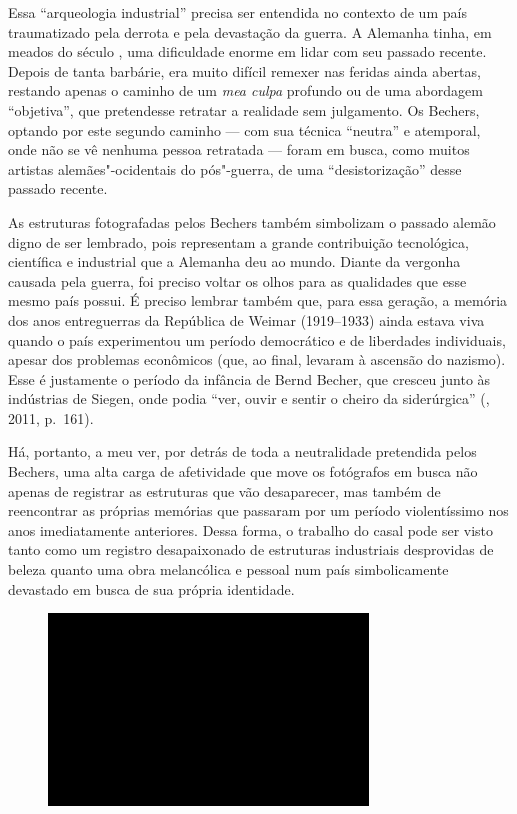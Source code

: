 Essa ``arqueologia industrial'' precisa ser entendida no contexto de um
país traumatizado pela derrota e pela devastação da guerra. A Alemanha
tinha, em meados do século , uma dificuldade enorme em lidar com seu
passado recente. Depois de tanta barbárie, era muito difícil remexer nas
feridas ainda abertas, restando apenas o caminho de um \emph{mea culpa}
profundo ou de uma abordagem ``objetiva'', que pretendesse retratar a
realidade sem julgamento. Os Bechers, optando por este segundo caminho
--- com sua técnica ``neutra'' e atemporal, onde não se vê nenhuma pessoa
retratada --- foram em busca, como muitos artistas alemães"-ocidentais do
pós"-guerra, de uma ``desistorização'' desse passado recente.

As estruturas fotografadas pelos Bechers também simbolizam o passado
alemão digno de ser lembrado, pois representam a grande contribuição
tecnológica, científica e industrial que a Alemanha deu ao mundo. Diante
da vergonha causada pela guerra, foi preciso voltar os olhos para as
qualidades que esse mesmo país possui. É preciso lembrar também que,
para essa geração, a memória dos anos entreguerras da República de
Weimar (1919--1933) ainda estava viva quando o país experimentou um
período democrático e de liberdades individuais, apesar dos problemas
econômicos (que, ao final, levaram à ascensão do nazismo). Esse é
justamente o período da infância de Bernd Becher, que cresceu junto às
indústrias de Siegen, onde podia ``ver, ouvir e sentir o cheiro da
siderúrgica'' (, 2011, p.~161).

Há, portanto, a meu ver, por detrás de toda a neutralidade pretendida
pelos Bechers, uma alta carga de afetividade que move os fotógrafos em busca não apenas de registrar as estruturas que vão desaparecer, mas também de reencontrar as próprias memórias que passaram por um período violentíssimo nos anos imediatamente anteriores. Dessa forma, o trabalho
do casal pode ser visto tanto como um registro desapaixonado de
estruturas industriais desprovidas de beleza quanto uma obra melancólica
e pessoal num país simbolicamente devastado em busca de sua própria
identidade.

\begin{figure}[!ht]

\centering
 \includegraphics[width=85mm]{./imgs/im1.jpg}
\caption{\tiny{}}

\end{figure}

